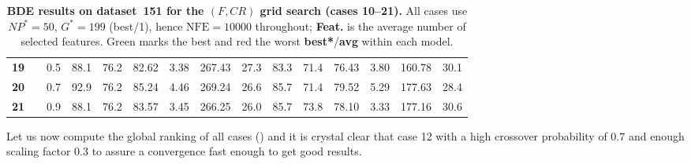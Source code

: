 \documentclass[12pt, openany]{article}
\begin{document}
\begin{table}[H]
{\begin{tabular}{|c c c | c c c c c c | c c c c c c |}
        \textbf{19} &  & 0.5 & 88.1 & 76.2 & 82.62 & 3.38 & 267.43 & 27.3 & \cellcolor{worst}83.3 & 71.4 & \cellcolor{worst}76.43 & 3.80 & 160.78 & 30.1 \\
        \textbf{20} &  & 0.7 & \cellcolor{best}92.9 & 76.2 & 85.24 & 4.46 & 269.24 & 26.6 & 85.7 & 71.4 & 79.52 & 5.29 & 177.63 & 28.4 \\
        \textbf{21} &  & 0.9 & 88.1 & 76.2 & 83.57 & 3.45 & 266.25 & 26.0 & 85.7 & 73.8 & 78.10 & 3.33 & 177.16 & 30.6 \\
        \hline
    \end{tabular}
    }
    \caption{\textbf{BDE results on dataset~151 for the $(F, CR)$ grid search (cases 10--21).} All cases use $NP^{*}{=}50$, $G^{*}{=}199$ (best/1), hence $\mathrm{NFE}=10000$ throughout; \textbf{Feat.} is the average number of selected features. Green marks the best and red the worst \textbf{best*}/\textbf{avg} within each model.}
    \label{tab:results_BDE_FCR_d151}
\end{table}

Let us now compute the global ranking of all cases () and it is crystal clear that case 12 with a high crossover probability of $0.7$ and enough scaling factor $0.3$ to assure a convergence fast enough to get good results.
\end{document}
